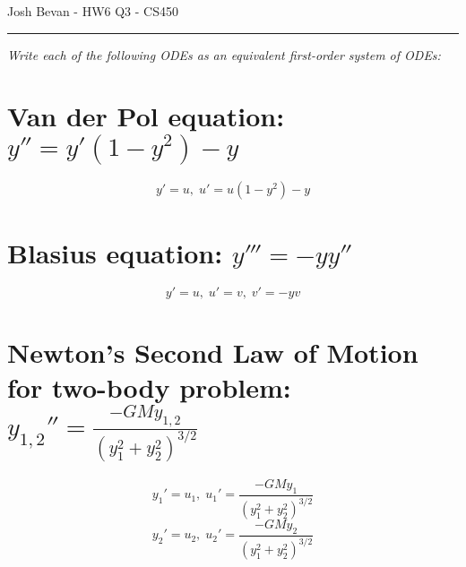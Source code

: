 \documentclass[letterpaper,10pt]{article}
\newcommand{\be}{\begin{equation}}
\newcommand{\ee}{\end{equation}}
\begin{document}
\begin{flushright}
{\Large Josh Bevan - HW6 Q3 - CS450}
\end{flushright}
\vskip -0.1in
\hrule
\vskip 0.3in

\textit{Write each of the following ODEs as an equivalent first-order system of ODEs:}

\section*{Van der Pol equation: $y''=y'(1-y^2)-y$}
\be y'=u, \; u' = u(1-y^2)-y \ee

\section*{Blasius equation: $y''' = -yy''$}
\be y' = u, \; u' = v, \; v' = -yv\ee

    
\section*{Newton's Second Law of Motion for two-body problem: $y_{1,2}'' = \frac{-GMy_{1,2}}{(y_1^2+y_2^2)^{3/2}}$}
\be y_1' = u_1, \; u_1' = \frac{-GMy_1}{(y_1^2+y_2^2)^{3/2}} \ee
\be y_2' = u_2, \; u_2' = \frac{-GMy_2}{(y_1^2+y_2^2)^{3/2}} \ee
\end{document}
